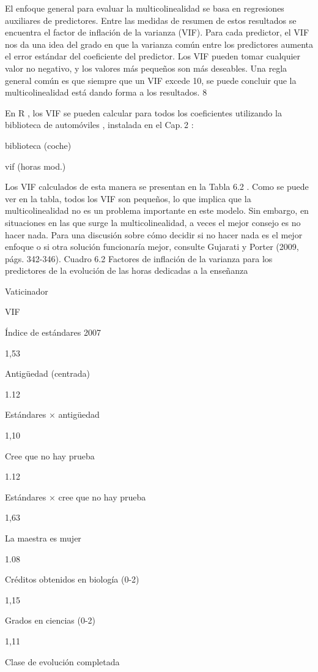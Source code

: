\documentclass[
]{book}
\begin{document}
El enfoque general para evaluar la multicolinealidad se basa en regresiones auxiliares de predictores. Entre las medidas de resumen de estos resultados se encuentra el factor de inflación de la varianza (VIF). Para cada predictor, el VIF nos da una idea del grado en que la varianza común entre los predictores aumenta el error estándar del coeficiente del predictor. Los VIF pueden tomar cualquier valor no negativo, y los valores más pequeños son más deseables. Una regla general común es que siempre que un VIF excede 10, se puede concluir que la multicolinealidad está dando forma a los resultados. 8

En R , los VIF se pueden calcular para todos los coeficientes utilizando la biblioteca de automóviles , instalada en el Cap. 2 :

biblioteca (coche)

vif (horas mod.)

Los VIF calculados de esta manera se presentan en la Tabla 6.2 . Como se puede ver en la tabla, todos los VIF son pequeños, lo que implica que la multicolinealidad no es un problema importante en este modelo. Sin embargo, en situaciones en las que surge la multicolinealidad, a veces el mejor consejo es no hacer nada. Para una discusión sobre cómo decidir si no hacer nada es el mejor enfoque o si otra solución funcionaría mejor, consulte Gujarati y Porter (2009, págs. 342-346).
Cuadro 6.2
Factores de inflación de la varianza para los predictores de la evolución de las horas dedicadas a la enseñanza

Vaticinador

VIF

Índice de estándares 2007

1,53

Antigüedad (centrada)

1.12

Estándares × antigüedad

1,10

Cree que no hay prueba

1.12

Estándares × cree que no hay prueba

1,63

La maestra es mujer

1.08

Créditos obtenidos en biología (0-2)

1,15

Grados en ciencias (0-2)

1,11

Clase de evolución completada
\end{document}
